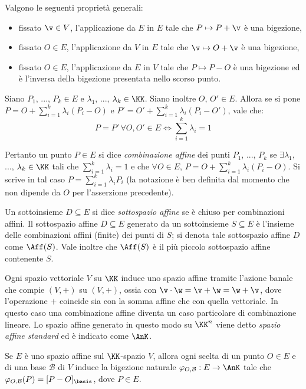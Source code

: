 \documentclass[10pt,landscape]{article}
\begin{document}
\begin{multicols}{3}
		Valgono le seguenti proprietà generali:
		\begin{itemize}
			\item fissato $\v \in V$, l'applicazione da $E$ in $E$ tale che $P \mapsto P+\v$ è una bigezione,
			\item fissato $O \in E$, l'applicazione da $V$ in $E$ tale che $\v \mapsto O+\v$ è una bigezione,
			\item fissato $O \in E$, l'applicazione da $E$ in $V$ tale che $P \mapsto P-O$ è una bigezione ed è l'inversa della bigezione presentata nello scorso punto.
		\end{itemize}
		
		Siano $P_1$, ..., $P_k \in E$ e $\lambda_1$, ..., $\lambda_k \in \KK$. Siano inoltre
		$O$, $O' \in E$. Allora se si pone $P=O+\sum_{i=1}^{k}\lambda_i (P_i-O)$ e $P'=O'+\sum_{i=1}^{k}\lambda_i (P_i-O')$, vale che:
		\[P=P' \, \forall O, O' \in E \iff\sum_{i=1}^{k}\lambda_i=1\]
		
		Pertanto un punto $P\in E$ si dice \textit{combinazione affine} dei punti $P_1$, ..., $P_k$ se $\exists \lambda_1$, ..., $\lambda_k \in \KK$ tali che $\sum_{i=1}^{k}\lambda_i=1$ e che $\forall O \in E$,
		$P=O+\sum_{i=1}^{k}\lambda_i (P_i-O)$. Si scrive in tal caso $P=\sum_{i=1}^{k}\lambda_i P_i$ (la notazione è ben definita dal momento che
		non dipende da $O$ per l'asserzione precedente).
		
		Un sottoinsieme $D\subseteq E$ si dice \textit{sottospazio affine} se è chiuso per combinazioni affini. Il sottospazio affine $D \subseteq E$ generato da un sottoinsieme $S \subseteq E$ è l'insieme delle combinazioni affini (finite) dei punti di $S$;
		si denota tale sottospazio affine $D$ come $\Aff(S)$. Vale inoltre che $\Aff(S)$ è il
		più piccolo sottospazio affine contenente $S$.
		        
        Ogni spazio vettoriale $V$ su $\KK$ induce uno spazio affine tramite l'azione banale che compie $(V, +)$ su $(V, +)$, ossia con $\v \cdot \w=\v+\w=\w+\v$, dove l'operazione $+$ coincide sia con la somma affine che
        con quella vettoriale.
        In questo caso una combinazione affine diventa un caso particolare di combinazione lineare. Lo spazio affine
        generato in questo modo su $\KK^n$ viene detto \textit{spazio affine standard} ed è indicato come $\AnK$. \\ \vskip 0.05in
        
        Se $E$ è uno spazio affine sul $\KK$-spazio $V$, allora ogni scelta di un punto $O \in E$ e di una base $\mathcal{B}$ di $V$ induce la bigezione naturale 
        $\varphi_{O,\mathcal{B}} : E \to \AnK$ tale che $\varphi_{O,\mathcal{B}}(P)=[P-O]_\basis$, dove $P \in E$.


\end{multicols}
\end{document}
